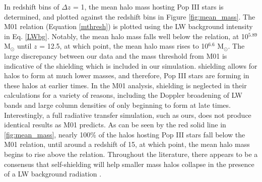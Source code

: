 \documentclass[a4paper,fleqn,usenatbib]{mnras}
\begin{document}
In redshift bins of $\Delta z$ = 1, the mean halo mass hosting Pop III stars is determined, and plotted against the redshift bins in Figure \ref{fig:mean_mass}. The M01 relation (Equation \ref{mthresh}) is plotted using the LW background intensity in Eq. \ref{LWbg}. Notably, the mean halo mass falls well below the relation, at 10$^{5.89}$ M$_{\odot}$ until $z$ = 12.5, at which point, the mean halo mass rises to 10$^{6.6}$ M$_{\odot}$. The large discrepancy between our data and the mass threshold from M01 is indicative of the \hh{} shielding which is included in our simulation. \hh{} shielding allows for halos to form at much lower masses, and therefore, Pop III stars are forming in these halos at earlier times. In the M01 analysis, \hh{} shielding is neglected in their calculations for a variety of reasons, including the Doppler broadening of LW bands and large column densities of \hh{} only beginning to form at late times. Interestingly, a full radiative transfer simulation, such as ours, does not produce identical results as M01 predicts. As can be seen by the red solid line in \ref{fig:mean_mass}, nearly 100\% of the halos hosting Pop III stars fall below the M01 relation, until around a redshift of 15, at which point, the mean halo mass begins to rise above the relation. Throughout the literature, there appears to be a consensus that \hh{} self-shielding will help smaller mass halos collapse in the presence of a LW background radiation \citep[E.g.][]{Yoshida03, Ricotti01, Glover01, Hartwig15}.
\end{document}
